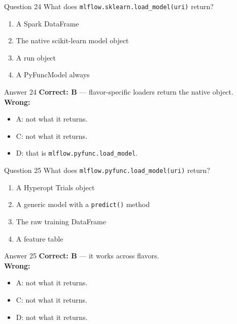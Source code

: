 \documentclass[aspectratio=169,11pt]{beamer}
\begin{document}
\begin{frame}{Question 24}
What does \texttt{mlflow.sklearn.load\_model(uri)} return?
\begin{enumerate}[label=\Alph*.]
\item A Spark DataFrame
\item The native scikit-learn model object
\item A run object
\item A PyFuncModel always
\end{enumerate}
\end{frame}
\begin{frame}{Answer 24}
\textbf{Correct: B} --- flavor-specific loaders return the native object.\\
\vspace{0.5em}
\textbf{Wrong:}
\begin{itemize}
\item A: not what it returns.
\item C: not what it returns.
\item D: that is \texttt{mlflow.pyfunc.load\_model}.
\end{itemize}
\end{frame}

\begin{frame}{Question 25}
What does \texttt{mlflow.pyfunc.load\_model(uri)} return?
\begin{enumerate}[label=\Alph*.]
\item A Hyperopt Trials object
\item A generic model with a \texttt{predict()} method
\item The raw training DataFrame
\item A feature table
\end{enumerate}
\end{frame}
\begin{frame}{Answer 25}
\textbf{Correct: B} --- it works across flavors.\\
\vspace{0.5em}
\textbf{Wrong:}
\begin{itemize}
\item A: not what it returns.
\item C: not what it returns.
\item D: not what it returns.
\end{itemize}
\end{frame}
\end{document}
